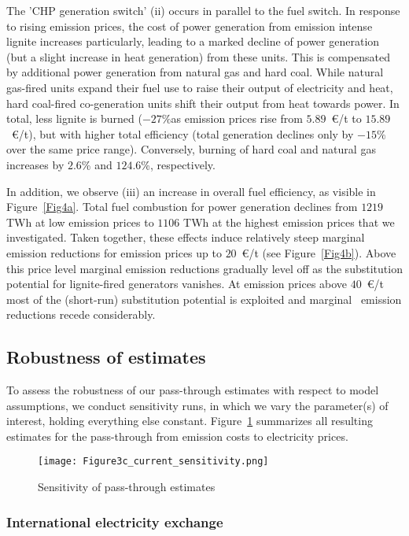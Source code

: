 \documentclass[preprint, 12pt, authoryear]{elsarticle}
\begin{document}
The 'CHP generation switch' (ii) occurs in parallel to the fuel switch.
In response to rising emission prices, the cost of power generation from emission intense lignite increases particularly, leading to a marked decline of power generation (but a slight increase in heat generation) from these units. This is compensated by additional power generation from natural gas and hard coal. While natural gas-fired units expand their fuel use to raise their output of electricity and heat, hard coal-fired co-generation units shift their output from heat towards power. 
In total, less lignite is burned ($-27\%$as emission prices rise from $5.89$~\euro{}/t to $15.89$~\euro{}/t), but with higher total efficiency (total generation declines only by $-15\%$ over the same price range). 
Conversely, burning of hard coal and natural gas increases by $2.6$\% and $124.6$\%, respectively.

In addition, we observe (iii) an increase in overall fuel efficiency, as visible in Figure~\ref{Fig4a}.
Total fuel combustion for power generation declines from $1219$ TWh at low emission prices to $1106$ TWh at the highest  emission prices that we investigated.
Taken together, these effects induce relatively steep marginal  emission reductions for emission prices up to $20$~\euro{}/t (see Figure~\ref{Fig4b}).
Above this price level marginal  emission reductions gradually level off as the substitution potential for lignite-fired generators vanishes. 
At emission prices above $40$~\euro{}/t most of the (short-run) substitution potential is exploited and marginal ~emission reductions recede considerably.

\subsection{Robustness of estimates}\label{robustn}
To assess the robustness of our pass-through estimates with respect to model assumptions, we conduct sensitivity runs, in which we vary the parameter(s) of interest, holding everything else constant.
Figure~\ref{Fig5} summarizes all resulting estimates for the pass-through from  emission costs to electricity prices.
\begin{figure}[t]
\centering
\texttt{[image: Figure3c\_current\_sensitivity.png]}
\caption{Sensitivity of pass-through estimates}\label{Fig5}
\end{figure}
\subsubsection*{International electricity exchange}
  
\end{document}
